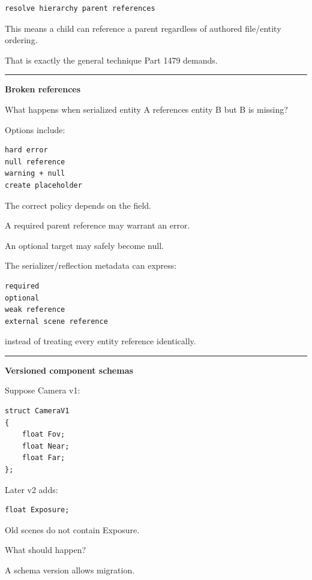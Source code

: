 \begin{verbatim}
resolve hierarchy parent references
\end{verbatim}

This means a child can reference a parent regardless of authored file/entity ordering.

That is exactly the general technique Part 1479 demands.

\begin{center}\rule{0.5\linewidth}{0.5pt}\end{center}

\textbf{Broken references}

What happens when serialized entity A references entity B but B is missing?

Options include:

\begin{verbatim}
hard error
null reference
warning + null
create placeholder
\end{verbatim}

The correct policy depends on the field.

A required parent reference may warrant an error.

An optional target may safely become null.

The serializer/reflection metadata can express:

\begin{verbatim}
required
optional
weak reference
external scene reference
\end{verbatim}

instead of treating every entity reference identically.

\begin{center}\rule{0.5\linewidth}{0.5pt}\end{center}

\textbf{Versioned component schemas}

Suppose Camera v1:

\begin{verbatim}
struct CameraV1
{
    float Fov;
    float Near;
    float Far;
};
\end{verbatim}

Later v2 adds:

\begin{verbatim}
float Exposure;
\end{verbatim}

Old scenes do not contain Exposure.

What should happen?

A schema version allows migration.

